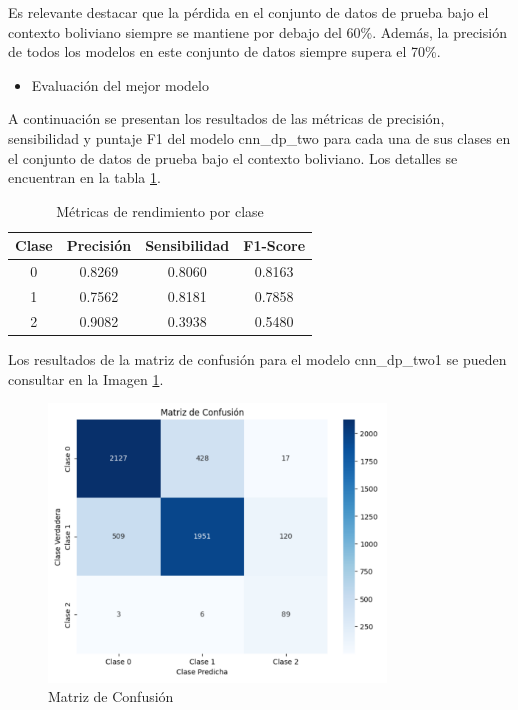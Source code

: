 Es relevante destacar que la pérdida en el conjunto de datos de prueba bajo el contexto boliviano siempre se mantiene por debajo del 60\%. Además, la precisión de todos los modelos en este conjunto de datos siempre supera el 70\%.

\begin{itemize}
\item Evaluación del mejor modelo
\end{itemize}

A continuación se presentan los resultados de las métricas de precisión, sensibilidad y puntaje F1 del modelo cnn\_dp\_two para cada una de sus clases en el conjunto de datos de prueba bajo el contexto boliviano. Los detalles se encuentran en la tabla \ref{tbl:metrics}.

\begin{table}[!ht]
	\centering
	\begin{tabular}{|c|c|c|c|}
		\hline
		\textbf{Clase} & \textbf{Precisión} & \textbf{Sensibilidad} & \textbf{F1-Score} \\ \hline
		0 & 0.8269 & 0.8060 & 0.8163 \\ \hline
		1 & 0.7562 & 0.8181 & 0.7858 \\ \hline
		2 & 0.9082 & 0.3938 & 0.5480 \\ \hline
	\end{tabular}
	\caption{Métricas de rendimiento por clase}
	\label{tbl:metrics}
\end{table}


Los resultados de la matriz de confusión para el modelo cnn\_dp\_two1 se pueden consultar en la Imagen \ref{fig:matriz}.


\begin{figure}[!h]
	\includegraphics[width=0.8\textwidth]{capitulo5/figuras/matriz_confusion.PNG}
	\caption{Matriz de Confusión }
	\label{fig:matriz}
\end{figure}

